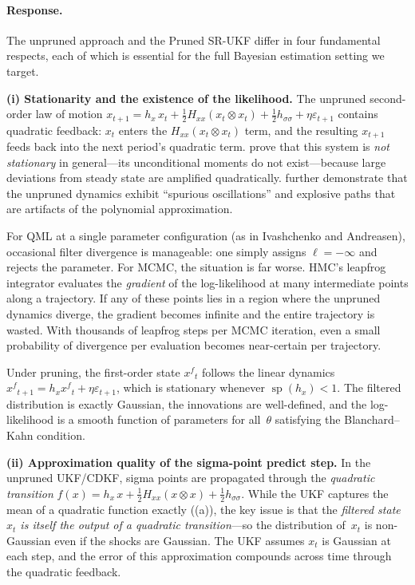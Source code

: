 \documentclass[12pt,a4paper]{article}
\newcommand{\kron}{\otimes}
\newcommand{\xf}{{x^{f}}}
\newcommand{\hx}{h_x}
\newcommand{\Hxx}{H_{xx}}
\newcommand{\hsig}{{h_{\sigma\sigma}}}
\DeclareMathOperator{\specrad}{sp}
\begin{document}
\paragraph{Response.}
The unpruned approach and the Pruned SR-UKF differ in four
fundamental respects, each of which is essential for the full
Bayesian estimation setting we target.

\medskip\noindent\textbf{(i) Stationarity and the existence of the
likelihood.}
The unpruned second-order law of motion
$x_{t+1} = \hx\,x_t + \tfrac{1}{2}\Hxx(x_t \kron x_t)
+ \tfrac{1}{2}\hsig + \eta\varepsilon_{t+1}$
contains quadratic feedback: $x_t$ enters the
$\Hxx(x_t \kron x_t)$ term, and the resulting $x_{t+1}$ feeds back
into the next period's quadratic term. \citet{andreasen2018pruned}
prove that this system is \emph{not stationary} in general---its
unconditional moments do not exist---because large deviations from
steady state are amplified quadratically.
\citet{denhaan2012solving} further demonstrate that the unpruned
dynamics exhibit ``spurious oscillations'' and explosive paths that
are artifacts of the polynomial approximation.

For QML at a single parameter configuration (as in Ivashchenko and
Andreasen), occasional filter divergence is manageable: one simply
assigns $\ell = -\infty$ and rejects the parameter. For MCMC, the
situation is far worse. HMC's leapfrog integrator evaluates the
\emph{gradient} of the log-likelihood at many intermediate points
along a trajectory. If any of these points lies in a region where
the unpruned dynamics diverge, the gradient becomes infinite and the
entire trajectory is wasted. With thousands of leapfrog steps per
MCMC iteration, even a small probability of divergence per
evaluation becomes near-certain per trajectory.

Under pruning, the first-order state $\xf_t$ follows the linear
dynamics $\xf_{t+1} = \hx\xf_t + \eta\varepsilon_{t+1}$, which is
stationary whenever $\specrad(\hx) < 1$. The filtered distribution is
exactly Gaussian, the innovations are well-defined, and the
log-likelihood is a smooth function of parameters for all~$\theta$
satisfying the Blanchard--Kahn condition.

\medskip\noindent\textbf{(ii) Approximation quality of the
sigma-point predict step.}
In the unpruned UKF/CDKF, sigma points are propagated through the
\emph{quadratic transition}
$f(x) = \hx\,x + \tfrac{1}{2}\Hxx(x \kron x) + \tfrac{1}{2}\hsig$.
While the UKF captures the mean of a quadratic function exactly
((a)), the key issue is that the \emph{filtered
state $x_t$ is itself the output of a quadratic transition}---so the
distribution of~$x_t$ is non-Gaussian even if the shocks are
Gaussian. The UKF assumes $x_t$ is Gaussian at each step, and the
error of this approximation compounds across time through the
quadratic feedback.
\end{document}
